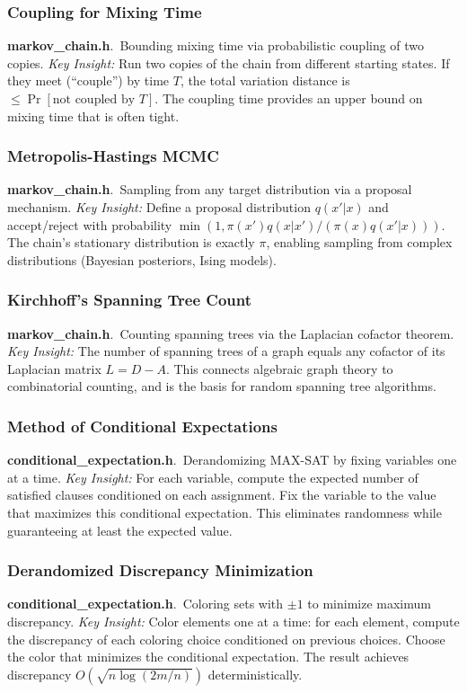 \documentclass[11pt,a4paper]{article}
\newcommand{\algo}[2]{\textbf{#1}.\ #2}
\newcommand{\insight}{\textit{Key Insight: }}
\begin{document}
\subsubsection{Coupling for Mixing Time}
\algo{markov\_chain.h}{Bounding mixing time via probabilistic coupling of two copies.}
\insight Run two copies of the chain from different starting states. If they meet (``couple'') by time \(T\), the total variation distance is \(\le \Pr[\text{not coupled by } T]\). The coupling time provides an upper bound on mixing time that is often tight.

\subsubsection{Metropolis-Hastings MCMC}
\algo{markov\_chain.h}{Sampling from any target distribution via a proposal mechanism.}
\insight Define a proposal distribution \(q(x'|x)\) and accept/reject with probability \(\min(1, \pi(x')q(x|x') / (\pi(x)q(x'|x)))\). The chain's stationary distribution is exactly \(\pi\), enabling sampling from complex distributions (Bayesian posteriors, Ising models).

\subsubsection{Kirchhoff's Spanning Tree Count}
\algo{markov\_chain.h}{Counting spanning trees via the Laplacian cofactor theorem.}
\insight The number of spanning trees of a graph equals any cofactor of its Laplacian matrix \(L = D - A\). This connects algebraic graph theory to combinatorial counting, and is the basis for random spanning tree algorithms.

\subsubsection{Method of Conditional Expectations}
\algo{conditional\_expectation.h}{Derandomizing MAX-SAT by fixing variables one at a time.}
\insight For each variable, compute the expected number of satisfied clauses conditioned on each assignment. Fix the variable to the value that maximizes this conditional expectation. This eliminates randomness while guaranteeing at least the expected value.

\subsubsection{Derandomized Discrepancy Minimization}
\algo{conditional\_expectation.h}{Coloring sets with \(\pm 1\) to minimize maximum discrepancy.}
\insight Color elements one at a time: for each element, compute the discrepancy of each coloring choice conditioned on previous choices. Choose the color that minimizes the conditional expectation. The result achieves discrepancy \(O(\sqrt{n \log(2m/n)})\) deterministically.
\end{document}
